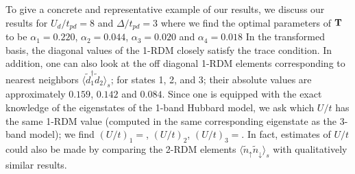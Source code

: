 To give a concrete and representative example of our results, we discuss our results 
for $U_d/t_{pd}=8$ and $\Delta/t_{pd}=3$ where 
we find the optimal parameters of ${\bf T}$ to be 
$\alpha_1=0.220$, $\alpha_2=0.044$, $\alpha_3=0.020$ and $\alpha_4=0.018$ 
In the transformed basis, the diagonal values of the 1-RDM closely 
satisfy the trace condition. In addition, one can also look at 
the off diagonal 1-RDM elements corresponding to nearest neighbors $\langle \tilde{d}_1^{\dagger} \tilde{d}_2 \rangle_s$; 
for states 1, 2, and 3; their absolute values are approximately $0.159$, $0.142$ and $0.084$. 
Since one is equipped with the exact knowledge of the eigenstates of the 1-band Hubbard model, we ask which 
$U/t$ has the same 1-RDM value (computed in the same corresponding eigenstate as the 3-band model); 
we find $(U/t)_1 = $, $(U/t)_2$, $(U/t)_3 = $. In fact, estimates of $U/t$ could also be 
made by comparing the 2-RDM elements $\langle \tilde{n}_{\uparrow} \tilde{n}_{\downarrow} \rangle_s$ 
with qualitatively similar results. 


